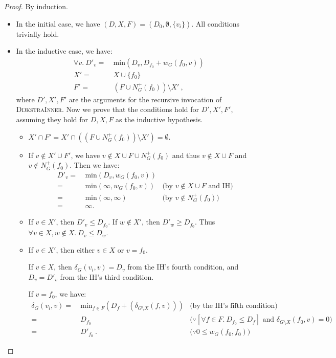 \documentclass[11pt,a4paper,oneside,microtype,chapter,nokorean]{oblivoir}
\begin{document}
\begin{proof}
  By induction.

  \begin{itemize}
  \item In the initial case, we have $(D, X, F) = (D_0, \emptyset, \{v_i\})$.  All conditions trivially hold.
  \item In the inductive case, we have:
    \begin{align*}
      \forall v.~D'_v =&~ \textrm{min}(D_v, D_{f_0} + w_G(f_0,v)) \\
      X' =&~ X \cup \{f_0\} \\
      F' =&~ (F \cup N^+_G(f_0)) \setminus X'~,
    \end{align*}
    where $D', X', F'$ are the arguments for the recursive invocation of \textsc{DijkstraInner}.
    Now we prove that the conditions hold for $D', X', F'$, assuming they hold for $D, X, F$ as the
    inductive hypothesis.

    \begin{itemize}
    \item $X' \cap F' = X' \cap ((F \cup N^+_G(f_0)) \setminus X') = \emptyset$.

    \item If $v \notin X' \cup F'$, we have $v \notin X \cup F \cup N^+_G(f_0)$ and thus
      $v \notin X \cup F$ and $v \notin N^+_G(f_0)$.  Then we have:
      \begin{align*}
        D'_v
        =&~ \textrm{min}(D_v, w_G(f_0,v)) \\
        =&~ \textrm{min}(\infty, w_G(f_0,v)) & \mbox{(by $v \notin X \cup F$ and IH)} \\
        =&~ \textrm{min}(\infty, \infty) & \mbox{(by $v \notin N^+_G(f_0)$)} \\
        =&~ \infty.
      \end{align*}

    \item If $v \in X'$, then $D'_v \le D_{f_0}$.  If $w \notin X'$, then $D'_w \ge D_{f_0}$.  Thus
      $\forall v\in X, w \notin X.~D_v \le D_w$.

    \item If $v \in X'$, then either $v \in X$ or $v = f_0$.

      If $v \in X$, then $\delta_G(v_i,v) = D_v$ from the IH's fourth condition, and $D_v = D'_v$
      from the IH's third condition.

      If $v = f_0$, we have:
      \begin{align*}
        \delta_G(v_i,v) =&~ \textrm{min}_{f \in F} (D_f + (\delta_{G \setminus X}(f,v))) & \mbox{(by the IH's
                                                                                           fifth condition)} \\
        =&~ D_{f_0} & \mbox{($\because [\forall f \in F.~D_{f_0} \le D_f]$ and
                      $\delta_{G \setminus X}(f_0,v) = 0$)} \\
        =&~ D'_{f_0}~. & \mbox{($\because 0 \le w_G(f_0,f_0)$)}
      \end{align*}


\end{itemize}
\end{itemize}
\end{proof}
\end{document}
